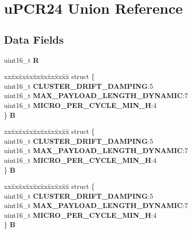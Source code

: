 \hypertarget{unionuPCR24}{}\section{u\+P\+C\+R24 Union Reference}
\label{unionuPCR24}
\subsection*{Data Fields}
\begin{DoxyCompactItemize}
\item 
\mbox{\label{unionuPCR24_a4c13180773e28c8eecf1224ddb6a21e9}} 
uint16\+\_\+t {\bfseries R}
\item 
\mbox{\label{unionuPCR24_ae9755b1ae1c3487b7b3af9fc9bd46fcd}} 
\begin{tabbing}
xx\=xx\=xx\=xx\=xx\=xx\=xx\=xx\=xx\=\kill
struct \{\\
\>uint16\_t {\bfseries CLUSTER\_DRIFT\_DAMPING}:5\\
\>uint16\_t {\bfseries MAX\_PAYLOAD\_LENGTH\_DYNAMIC}:7\\
\>uint16\_t {\bfseries MICRO\_PER\_CYCLE\_MIN\_H}:4\\
\} {\bfseries B}\\

\end{tabbing}\item 
\mbox{\label{unionuPCR24_ab05cfaf0087d49fd8c80109c5193afa8}} 
\begin{tabbing}
xx\=xx\=xx\=xx\=xx\=xx\=xx\=xx\=xx\=\kill
struct \{\\
\>uint16\_t {\bfseries CLUSTER\_DRIFT\_DAMPING}:5\\
\>uint16\_t {\bfseries MAX\_PAYLOAD\_LENGTH\_DYNAMIC}:7\\
\>uint16\_t {\bfseries MICRO\_PER\_CYCLE\_MIN\_H}:4\\
\} {\bfseries B}\\

\end{tabbing}\item 
\mbox{\label{unionuPCR24_ad1bf31b0e00423c95699eb96fcb18285}} 
\begin{tabbing}
xx\=xx\=xx\=xx\=xx\=xx\=xx\=xx\=xx\=\kill
struct \{\\
\>uint16\_t {\bfseries CLUSTER\_DRIFT\_DAMPING}:5\\
\>uint16\_t {\bfseries MAX\_PAYLOAD\_LENGTH\_DYNAMIC}:7\\
\>uint16\_t {\bfseries MICRO\_PER\_CYCLE\_MIN\_H}:4\\
\} {\bfseries B}\\


\end{tabbing}
\end{DoxyCompactItemize}
